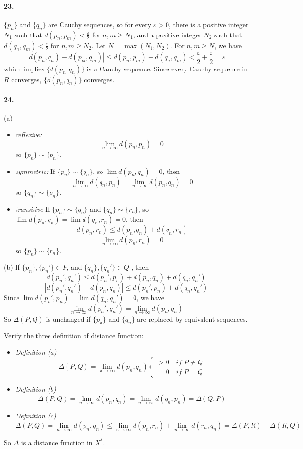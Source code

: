 \documentclass[a4paper]{article}
\begin{document}
\paragraph{23.}
$\{p_n\}$ and $\{q_n\}$ are Cauchy sequences, so for every $\varepsilon>0$, there is a positive integer $N_1$ such that $d(p_n,p_m)<\frac{\varepsilon}{2}$ for $n,m\geq N_1$, and a positive integer $N_2$ such that $d(q_n,q_m)<\frac{\varepsilon}{2}$ for $n,m\geq N_2$. Let $N=\max(N_1,N_2)$. For $n,m\geq N$, we have
\[
\left|d(p_n,q_n)-d(p_m,q_m) \right|\leq d(p_n,p_m)+d(q_n,q_m)<\frac{\varepsilon}{2}+\frac{\varepsilon}{2}=\varepsilon
\]
which implies $\{d(p_n,q_n)\}$ is a Cauchy sequence. Since every Cauchy sequence in $R$ converges, $\{d(p_n,q_n)\}$ converges.

\paragraph{24.}
(a)
\begin{itemize}
\item \textit{reflexive:} 
\[
\lim_{n\to\infty}d(p_n,p_n)=0
\]
so $\{p_n\}\sim\{p_n\}$.
\item \textit{symmetric:} If $\{p_n\}\sim\{q_n\}$, so $\lim d(p_n,q_n)=0$, then
\[
\lim_{n\to\infty}d(q_n,p_n)=\lim_{n\to\infty}d(p_n,q_n)=0
\]
so $\{q_n\}\sim\{p_n\}$.
\item \textit{transitive} If $\{p_n\}\sim\{q_n\}$ and $\{q_n\}\sim\{r_n\}$, so $\lim d(p_n,q_n)=\lim d(q_n,r_n)=0$, then
\[
d(p_n,r_n)\leq d(p_n,q_n)+d(q_n,r_n)
\]
\[
\lim_{n\to\infty}d(p_n,r_n)=0
\]
so $\{p_n\}\sim\{r_n\}$.
\end{itemize}
\medskip 

(b)
If $\{p_n\},\{p_n'\}\in P$, and $\{q_n\},\{q_n'\}\in Q$
, then
\[
d(p_n',q_n')\leq d(p_n',p_n)+d(p_n,q_n)+d(q_n,q_n')
\]
\[
|d(p_n',q_n')-d(p_n,q_n) |\leq d(p_n',p_n)+d(q_n,q_n')
\]
Since $\lim d(p_n',p_n)=\lim d(q_n,q_n')=0$, we have
\[
\lim_{n\to\infty}d(p_n',q_n')=\lim_{n\to\infty}d(p_n,q_n)
\]
So $\Delta(P,Q)$ is unchanged if $\{p_n\}$ and $\{q_n\}$ are replaced by equivalent sequences.

Verify the three definition of distance function:
\begin{itemize}
    \item \textit{Definition (a)}
    \[
    \Delta(P,Q)=\lim_{n\to\infty}d(p_n,q_n)\begin{cases}
    >0\quad \textit{if $P\neq Q$}\\
    =0\quad \textit{if $P=Q$}
    \end{cases}
    \]
    \item \textit{Definition (b)}
    \[
    \Delta(P,Q)=\lim_{n\to\infty}d(p_n,q_n)=\lim_{n\to\infty}d(q_n,p_n)=\Delta(Q,P)
    \]
    \item \textit{Definition (c)}
    \[
    \Delta(P,Q)=\lim_{n\to\infty}d(p_n,q_n)\leq\lim_{n\to\infty}d(p_n,r_n)+\lim_{n\to\infty}d(r_n,q_n)=\Delta(P,R)+\Delta(R,Q)
    \]
\end{itemize}
So $\Delta$ is a distance function in $X^*$.
\medskip
\end{document}
